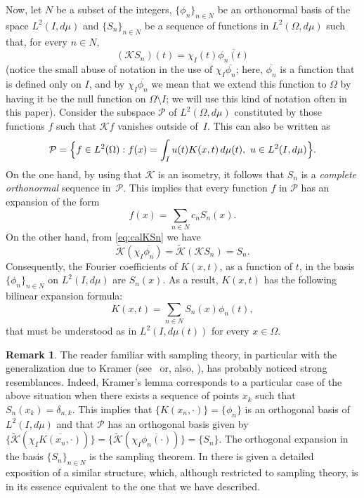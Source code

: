 \documentclass[11pt,a4paper]{amsart}
\theoremstyle{plain}
\theoremstyle{definition}
\newtheorem{Rem}{Remark}
\newcommand{\calK}{\mathcal{K}}
\newcommand{\calP}{\mathcal{P}}
\begin{document}
Now, let $N$ be a subset of the integers, $\{\phi_{n}\}_{n\in N}$ be
an orthonormal basis of the space $L^{2}(I,d\mu)$ and $\{S_{n}\}_{n\in N}$ be 
a sequence of functions in $L^{2}(\Omega,d\mu)$ such that, for every $n\in N$,
\begin{equation}
\label{eq:calKSn}
  (\calK S_{n})(t) = \chi_{I}(t)\overline{\phi_{n}(t)}
\end{equation}
(notice the small abuse of notation in the use of $\chi_{I}\overline{\phi_{n}}$;
here, $\overline{\phi_{n}}$ is a function that is defined only on $I$, and by
$\chi_{I}\overline{\phi_{n}}$ we mean that we extend this function to $\Omega$ by
having it be the null function on $\Omega \setminus I$; we will use this kind
of notation often in this paper). Consider
the subspace $\calP$ of $L^{2}(\Omega,d\mu)$ constituted by those
functions $f$ such that $\calK f$ vanishes outside of~$I$. This can
also be written as
\begin{equation*}
  \calP = \Bigl\{ f\in L^{2}(\Omega) :
  f(x) = \int_{I} u(t)K(x,t)\,d\mu(t),\ u\in L^{2}(I,d\mu) \Bigr\}.
\end{equation*}
On the one hand, by using that $\calK$ is an isometry,
it follows that $S_{n}$ is a \emph{complete orthonormal} sequence
in~$\calP$. This implies that every function $f$ in $\calP$
has an expansion of the form
\begin{equation}
\label{eq:fcS}
  f(x) = \sum_{n\in N} c_{n}S_{n}(x).
\end{equation}
On the other hand, from \eqref{eq:calKSn} we have
\begin{equation*}
  \widetilde{\calK}(\chi_{I}\overline{\phi_{n}})
  = \widetilde{\calK}(\calK S_{n}) = S_{n}.
\end{equation*}
Consequently, the Fourier coefficients of $K(x,t)$, as a function of $t$, in
the basis $\{\phi_{n}\}_{n\in N}$ on $L^2(I,d\mu)$ are $S_{n}(x)$.
As a result, $K(x,t)$  has the following bilinear expansion formula:
\begin{equation}
\label{eq:Kxt}
  K(x,t) = \sum_{n\in N}S_{n}(x)\phi_{n}(t),
\end{equation}
that must be understood as in $L^2(I,d\mu(t))$ for every $x \in \Omega$.

\begin{Rem}
The reader familiar with sampling theory, in particular with the
generalization due to Kramer (see~\cite{Kramer} or, also, 
\cite[Theorem~3.5]{Zayed-book}), has probably noticed strong resemblances. 
Indeed, Kramer's lemma corresponds to a particular
case of the above situation when there exists a sequence of points
$x_{k}$ such that $S_{n}(x_{k}) = \delta_{n,k}$. This implies that
$\{K(x_{n},\cdot)\} = \{\phi_{n}\}$ is an orthogonal basis of
$L^{2}(I,d\mu)$ and that $\calP$ has an orthogonal basis given by
$\{\widetilde{\calK}(\chi_I\overline{K(x_{n},\cdot)})\} =
\{\widetilde{\calK}(\chi_I\overline{\phi_{n}(\cdot)})\} =
\{S_{n}\}$. The orthogonal expansion in the basis $\{S_{n}\}_{n\in N}$ 
is the sampling theorem. In \cite{Garcia} there is given a
detailed exposition of a similar structure, which, although restricted
to sampling theory, is in its essence equivalent to the one that we 
have described.
\end{Rem}
\end{document}

